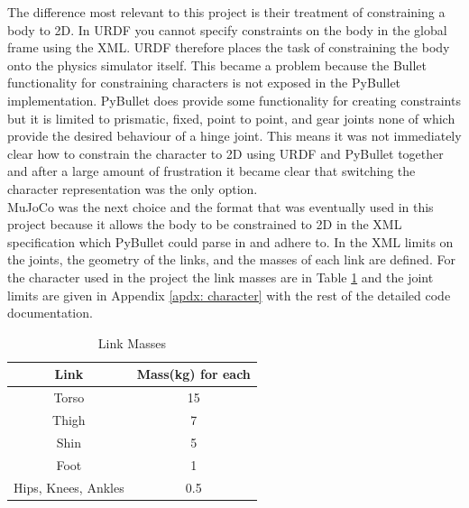 \documentclass[12pt, a4paper]{article}
\begin{document}
The difference most relevant to this project is their treatment of constraining a body to 2D. In URDF you cannot specify constraints on the body in the global frame using the XML. URDF therefore places the task of constraining the body onto the physics simulator itself. This became a problem because the Bullet functionality for constraining characters is not exposed in the PyBullet implementation. PyBullet does provide some functionality for creating constraints but it is limited to prismatic, fixed, point to point, and gear joints none of which provide the desired behaviour of a hinge joint. This means it was not immediately clear how to constrain the character to 2D using URDF and PyBullet together and after a large amount of frustration it became clear that switching the character representation was the only option.\\

MuJoCo was the next choice and the format that was eventually used in this project because it allows the body to be constrained to 2D in the XML specification which PyBullet could parse in and adhere to. In the XML limits on the joints, the geometry of the links, and the masses of each link are defined. For the character used in the project the link masses are in Table \ref{tbl:link masses} and the joint limits are given in Appendix \ref{apdx: character} with the rest of the detailed code documentation.\\

\begin{table}[ht]
\caption{Link Masses}
\begin{center}
\begin{tabular}{|c|c|}
\hline
Link & Mass(kg) for each\\
\hline
Torso & 15\\
\hline
Thigh & 7\\
\hline
Shin  & 5\\
\hline
Foot & 1\\
\hline
Hips, Knees, Ankles & 0.5\\
\hline
\end{tabular}
\end{center}
\label{tbl:link masses}
\end{table}
\end{document}
